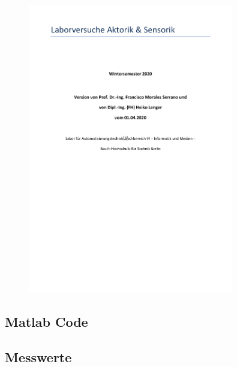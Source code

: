 \begin{figure}[H]
    \centering
    \includegraphics[page=4, width=0.8\textwidth]{../Aufgabenstellung.pdf}
    \label{fig:Aufgabenstellung A1}
\end{figure}

\subsection{Matlab Code}





\subsection{Messwerte}


